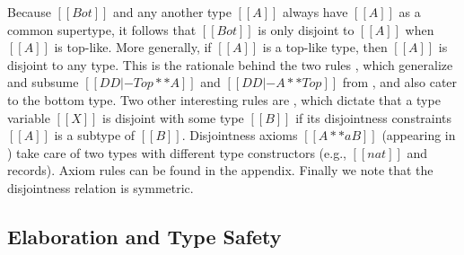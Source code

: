 Because $[[Bot]]$ and any another type $[[A]]$ always have $[[A]]$ as
a common supertype,
it follows that $[[Bot]]$ is only disjoint to $[[A]]$ when
$[[A]]$ is top-like.
More generally, if $[[A]]$ is a top-like type, then $[[A]]$ is disjoint to any
type. This is the rationale behind the two rules , which
generalize and subsume $[[ DD |- Top ** A ]]$ and $[[ DD |- A ** Top ]]$ from \fname, and
also cater to the bottom type.
Two other interesting rules are
, which dictate that a type variable $[[X]]$ is disjoint
with some type $[[B]]$ if its disjointness constraints $[[A]]$ is a subtype of
$[[B]]$.
Disjointness axioms $[[ A **a B ]]$ (appearing in ) take
care of two types with different type constructors (e.g., $[[nat]]$ and records). Axiom rules can be found in the appendix.
Finally we note that the disjointness relation is symmetric.



\subsection{Elaboration and Type Safety}
\label{sec:elaboration:fi}

